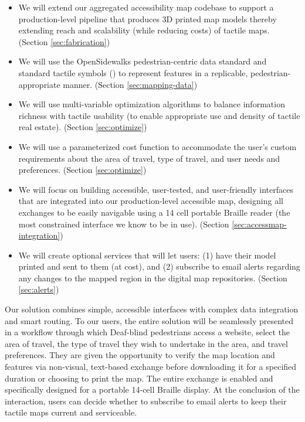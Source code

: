 \begin{itemize}
    \item We will extend our aggregated accessibility map codebase to support a production-level pipeline that produces 3D printed map models thereby extending reach and scalability (while reducing costs) of tactile maps.  (Section \ref{sec:fabrication})
    \item We will use the OpenSidewalks pedestrian-centric data standard \cite{bolten2017} and standard tactile symbols (\cite{BANA}) to represent features in a replicable, pedestrian-appropriate manner.  (Section \ref{sec:mapping-data})
    \item We will use multi-variable optimization algorithms to balance information richness with tactile usability (to enable appropriate use and density of tactile real estate). (Section \ref{sec:optimize})
    \item We will use a parameterized cost function to accommodate the user’s custom requirements about the area of travel, type of travel, and user needs and preferences.  (Section \ref{sec:optimize})
    \item We will focus on building accessible, user-tested, and user-friendly interfaces that are integrated into our production-level accessible map, designing all exchanges to be easily navigable using a 14 cell portable Braille reader (the most constrained interface we know to be in use). (Section \ref{sec:accessmap-integration})
    \item We will create optional services that will let users: (1) have their model printed and sent to them (at cost), and (2) subscribe to email alerts regarding any changes to the mapped region in the digital map repositories. (Section \ref{sec:alerts})
\end{itemize}

Our solution combines simple, accessible interfaces with complex data integration and smart routing. To our users, the entire solution will be seamlessly presented in a workflow through which Deaf-blind pedestrians access a website, select the area of travel, the type of travel they wish to undertake in the area, and travel preferences. They are given the opportunity to verify the map location and features via non-visual, text-based exchange before downloading it for a specified duration or choosing to print the map. The entire exchange is enabled and specifically designed for a portable 14-cell Braille display. At the conclusion of the interaction, users can decide whether to subscribe to email alerts to keep their tactile maps current and serviceable. 

